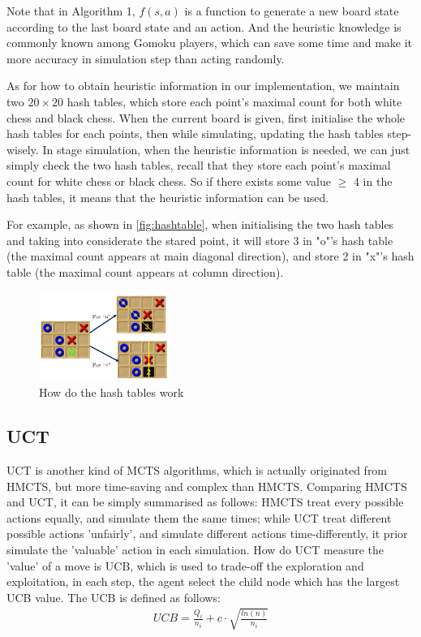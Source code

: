 \documentclass[sigconf, nonacm]{acmart}
\begin{document}
Note that in Algorithm 1, $f(s, a)$ is a function to generate a new board state according to the last board state and an action.
%
And the heuristic knowledge is commonly known among Gomoku players, which can save some time and make it more accuracy in simulation step than acting randomly. 

As for how to obtain heuristic information in our implementation, we maintain two $20\times 20$ hash tables, which store each point's maximal count for both white chess and black chess.
%
When the current board is given, first initialise the whole hash tables for each points, then while simulating, updating the hash tables step-wisely.
%
In stage simulation, when the heuristic information is needed, we can just simply check the two hash tables, recall that they store each point's maximal count for white chess or black chess. So if there exists some value $\geq$ 4 in the hash tables, it means that the heuristic information can be used.

For example, as shown in \autoref{fig:hashtable}, when initialising the two hash tables and taking into considerate the stared point, it will store 3 in "o"'s hash table (the maximal count appears at main diagonal direction), and store 2 in "x"'s hash table (the maximal count appears at column direction).

\begin{figure}[h]
  \centering
  \includegraphics[width=0.38\textwidth]{figures/2.png}
  \caption{How do the hash tables work}
  \label{fig:hashtable}
\end{figure}


\subsection{UCT}
%
\quad UCT is another kind of MCTS algorithms, which is actually originated from HMCTS, but more time-saving and complex than HMCTS. 
%
Comparing HMCTS and UCT, it can be simply summarised as follows: HMCTS treat every possible actions equally, and simulate them the same times; while UCT treat different possible actions 'unfairly', and simulate different actions time-differently, it prior simulate the 'valuable' action in each simulation.
%
How do UCT measure the 'value' of a move is UCB, which is used to trade-off the exploration and exploitation, in each step, the agent select the child node which has the largest UCB value.
%
The UCB is defined as follows:
\begin{align*}
    UCB = \frac{Q_i}{n_i} + c\cdot \sqrt{\frac{ln(n)}{n_i}}\tag{1}
\end{align*}
\end{document}
